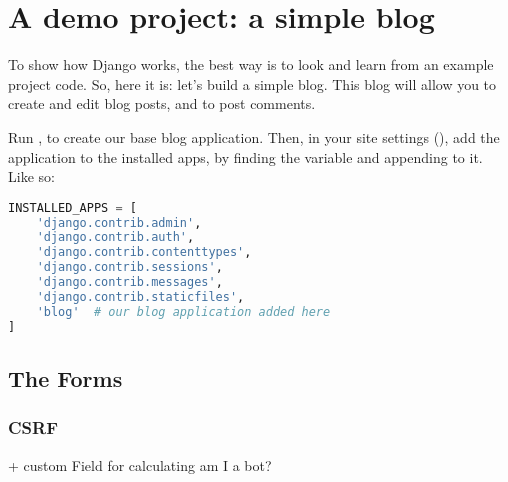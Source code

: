 \section{A demo project: a simple blog}
    To show how Django works, the best way is to look and learn from an example project code.
    So, here it is: let's build a simple blog. This blog will allow you to create and edit blog posts,
    and to post comments.
    
    Run , to create our base blog application.
    Then, in your site settings (), add the 
    application to the installed apps, 
    by finding the  variable 
    and appending  to it. Like so:
    
    \begin{lstlisting}[language=python, numbers=none, title=\texttt{mysite/settings.py}]
INSTALLED_APPS = [
    'django.contrib.admin',
    'django.contrib.auth',
    'django.contrib.contenttypes',
    'django.contrib.sessions',
    'django.contrib.messages',
    'django.contrib.staticfiles',
    'blog'  # our blog application added here
]
    \end{lstlisting}
    
    
    
    
    
    
    
    
    

    \subsection{The Forms}
        \label{sec:the-forms}
        \subsubsection{CSRF}
        + custom Field for calculating am I a bot?
